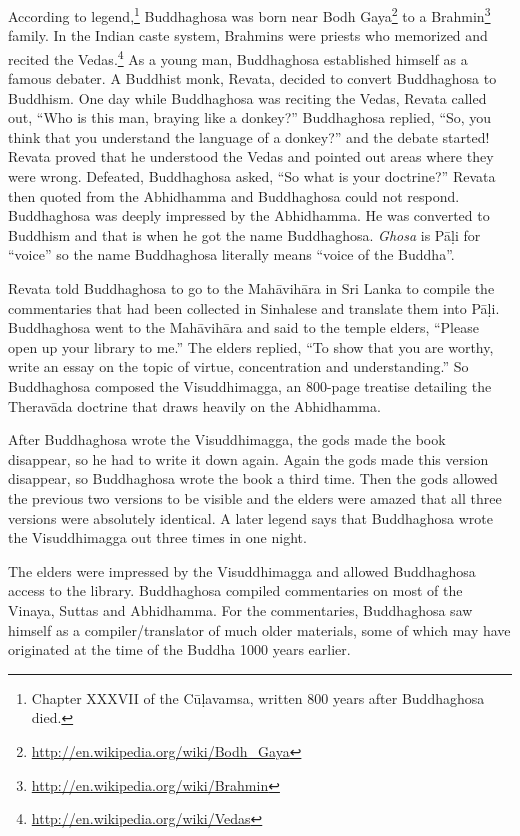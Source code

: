 According to legend,\footnote{Chapter XXXVII of the Cūḷavamsa, written 800 years after Buddhaghosa died.} Buddhaghosa was born near Bodh Gaya\footnote{\url{http://en.wikipedia.org/wiki/Bodh_Gaya}} to a Brahmin\footnote{\url{http://en.wikipedia.org/wiki/Brahmin}} family. In the Indian caste system, Brahmins were priests who memorized and recited the Vedas.\footnote{\url{http://en.wikipedia.org/wiki/Vedas}} As a young man, Buddhaghosa established himself as a famous debater. A Buddhist monk, Revata, decided to convert Buddhaghosa to Buddhism. One day while Buddhaghosa was reciting the Vedas, Revata called out, “Who is this man, braying like a donkey?” Buddhaghosa replied, “So, you think that you understand the language of a donkey?” and the debate started! Revata proved that he understood the Vedas and pointed out areas where they were wrong. Defeated, Buddhaghosa asked, “So what is your doctrine?” Revata then quoted from the Abhidhamma and Buddhaghosa could not respond. Buddhaghosa was deeply impressed by the Abhidhamma. He was converted to Buddhism and that is when he got the name Buddhaghosa. \textit{Ghosa} is Pāḷi for “voice” so the name Buddhaghosa literally means “voice of the Buddha”.

Revata told Buddhaghosa to go to the Mahāvihāra in Sri Lanka to compile the commentaries that had been collected in Sinhalese and translate them into Pāḷi. Buddhaghosa went to the Mahāvihāra and said to the temple elders, “Please open up your library to me.” The elders replied, “To show that you are worthy, write an essay on the topic of virtue, concentration and understanding.” So Buddhaghosa composed the Visuddhimagga, an 800-page treatise detailing the Theravāda doctrine that draws heavily on the Abhidhamma.

After Buddhaghosa wrote the Visuddhimagga, the gods made the book disappear, so he had to write it down again. Again the gods made this version disappear, so Buddhaghosa wrote the book a third time. Then the gods allowed the previous two versions to be visible and the elders were amazed that all three versions were absolutely identical. A later legend says that Buddhaghosa wrote the Visuddhimagga out three times in one night. 

The elders were impressed by the Visuddhimagga and allowed Buddhaghosa access to the library. Buddhaghosa compiled commentaries on most of the Vinaya, Suttas and Abhidhamma. For the commentaries, Buddhaghosa saw himself as a compiler/translator of much older materials, some of which may have originated at the time of the Buddha 1000 years earlier.

